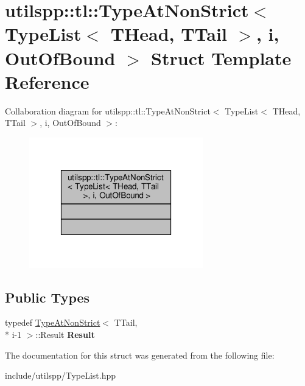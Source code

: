 \hypertarget{structutilspp_1_1tl_1_1TypeAtNonStrict_3_01TypeList_3_01THead_00_01TTail_01_4_00_01i_00_01OutOfBound_01_4}{\section{utilspp\-:\-:tl\-:\-:Type\-At\-Non\-Strict$<$ Type\-List$<$ T\-Head, T\-Tail $>$, i, Out\-Of\-Bound $>$ Struct Template Reference}
\label{structutilspp_1_1tl_1_1TypeAtNonStrict_3_01TypeList_3_01THead_00_01TTail_01_4_00_01i_00_01OutOfBound_01_4}
}


Collaboration diagram for utilspp\-:\-:tl\-:\-:Type\-At\-Non\-Strict$<$ Type\-List$<$ T\-Head, T\-Tail $>$, i, Out\-Of\-Bound $>$\-:
\nopagebreak
\begin{figure}[H]
\begin{center}
\leavevmode
\includegraphics[width=214pt]{structutilspp_1_1tl_1_1TypeAtNonStrict_3_01TypeList_3_01THead_00_01TTail_01_4_00_01i_00_01OutOfBound_01_4__coll__graph}
\end{center}
\end{figure}
\subsection*{Public Types}
\begin{DoxyCompactItemize}
\item 
\hypertarget{structutilspp_1_1tl_1_1TypeAtNonStrict_3_01TypeList_3_01THead_00_01TTail_01_4_00_01i_00_01OutOfBound_01_4_a0f82dc55e7e14377d2658f6be288ca82}{typedef \hyperlink{structutilspp_1_1tl_1_1TypeAtNonStrict}{Type\-At\-Non\-Strict}$<$ T\-Tail, \\*
i-\/1 $>$\-::Result {\bfseries Result}}\label{structutilspp_1_1tl_1_1TypeAtNonStrict_3_01TypeList_3_01THead_00_01TTail_01_4_00_01i_00_01OutOfBound_01_4_a0f82dc55e7e14377d2658f6be288ca82}

\end{DoxyCompactItemize}


The documentation for this struct was generated from the following file\-:\begin{DoxyCompactItemize}
\item 
include/utilspp/Type\-List.\-hpp\end{DoxyCompactItemize}
